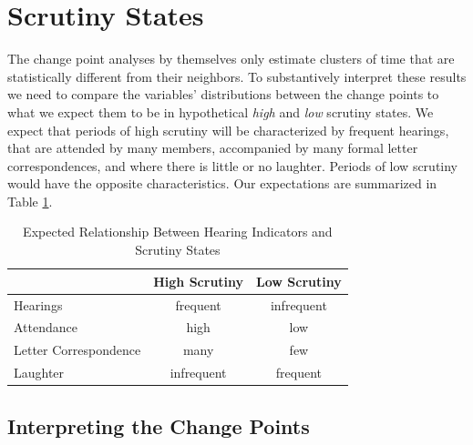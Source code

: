 \documentclass[a4paper]{article}\usepackage[]{graphicx}\usepackage[]{color}
\begin{document}
\section{Scrutiny States}

The change point analyses by themselves only estimate clusters of time that are statistically different from their neighbors. To substantively interpret these results we need to compare the variables' distributions between the change points to what we expect them to be in hypothetical \emph{high} and \emph{low} scrutiny states. We expect that periods of high scrutiny will be characterized by frequent hearings, that are attended by many members, accompanied by many formal letter correspondences, and where there is little or no laughter. Periods of low scrutiny would have the opposite characteristics. Our expectations are summarized in Table \ref{ExpectedTable}.

\begin{table}
    \caption{Expected Relationship Between Hearing Indicators and Scrutiny States}
    \label{ExpectedTable}
    \begin{center}
        \begin{tabular}{l | c c}
            \hline
            & High Scrutiny & Low Scrutiny \\
            \hline \hline
            Hearings & frequent & infrequent \\[0.25cm]
            Attendance & high & low \\[0.25cm]
            Letter Correspondence & many & few \\[0.25cm]
            Laughter & infrequent & frequent \\
            \hline
        \end{tabular}
    \end{center}
\end{table}

\subsection{Interpreting the Change Points}
\end{document}
